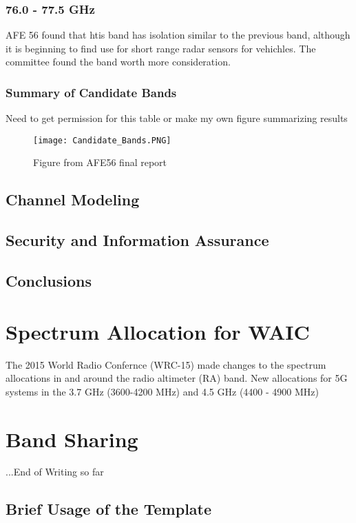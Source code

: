 \subsubsection{76.0 - 77.5 GHz}
 AFE 56 found that htis band has isolation similar to the previous band, although it is beginning to find use for short range radar sensors for vehichles. The committee found the band worth more consideration. 
 
\subsubsection{Summary of Candidate Bands}
 Need to get permission for this table or make my own figure summarizing results
 \begin{figure}
 \centering
 \texttt{[image: Candidate\_Bands.PNG]}
 \caption{Figure from AFE56 final report}
 \end{figure}
 
\subsection{Channel Modeling}

\subsection{Security and Information Assurance}

\subsection{Conclusions}
 
\section{Spectrum Allocation for WAIC}
The 2015 World Radio Confernce (WRC-15) made changes to the spectrum allocations in and around the radio altimeter (RA) band. New allocations for 5G systems in the 3.7 GHz (3600-4200 MHz) and 4.5 GHz (4400 - 4900 MHz)

\section{Band Sharing}


...End of Writing so far

\subsection{Brief Usage of the Template}


